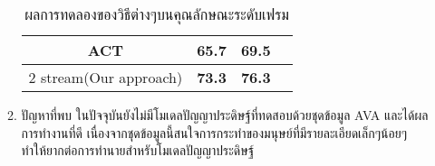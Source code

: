 \begin{enumerate}
\begin{enumerate}
\begin{table}[!ht]
\begin{tabular}{|c|c|c|c|}
					ACT					& 65.7				& 69.5						\\
					\hline
					2 stream(Our approach)		& \textbf{73.3}		& \textbf{76.3}				\\
					\hline
				\end{tabular}
				\caption{ผลการทดลองของวิธีต่างๆบนคุณลักษณะระดับเฟรม}
				\label{tab: transfer learning}
			\end{table}
		\item ปัญหาที่พบ
		ในปัจจุบันยังไม่มีโมเดลปัญญาประดิษฐ์ที่ทดสอบด้วยชุดข้อมูล AVA และได้ผลการทำงานที่ดี เนื่องจากชุดข้อมูลนี้สนใจการกระทำของมนุษย์ที่มีรายละเอียดเล็กๆน้อยๆ 
		ทำให้ยากต่อการทำนายสำหรับโมเดลปัญญาประดิษฐ์
	\end{enumerate}
\end{enumerate}
\clearpage
